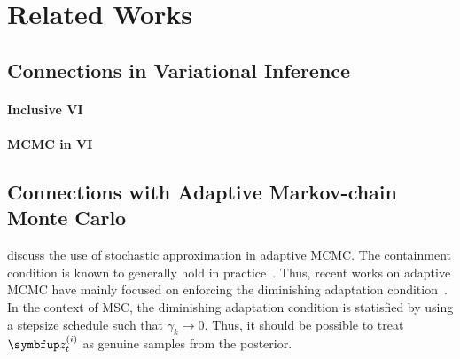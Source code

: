 
\section{Related Works}
\subsection{Connections in Variational Inference}
\paragraph{Inclusive VI}

\paragraph{MCMC in VI}

\subsection{Connections with Adaptive Markov-chain Monte Carlo}
\citet{10.1007/s11222-008-9110-y, garthwaite_adaptive_2016} discuss the use of stochastic approximation in adaptive MCMC.
The containment condition is known to generally hold in practice~\citep{rosenthal_optimal_, article}.
Thus, recent works on adaptive MCMC have mainly focused on enforcing the diminishing adaptation condition~\citep{wang_adaptive_2013}.
In the context of MSC, the diminishing adaptation condition is statisfied by using a stepsize schedule such that \(\gamma_k \rightarrow 0\).
Thus, it should be possible to treat \(\vz^{(i)}_t\) as genuine samples from the posterior.


